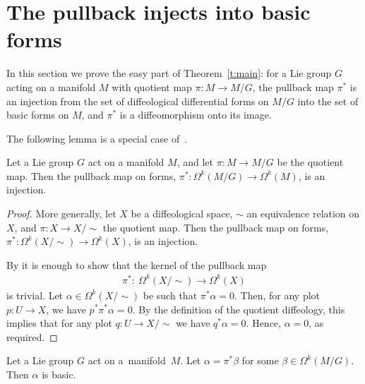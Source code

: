 \section{The pullback injects into basic forms}\label{sec:injects}

In this section we prove the easy part of Theorem~\ref{t:main}:
for a Lie group $G$ acting on a manifold $M$
with quotient map $\pi \colon M \to M/G$,
the pullback map $\pi^*$ is an injection
from the set of dif\/feological dif\/ferential forms on $M/G$
into the set of basic forms on $M$,
and $\pi^*$ is a dif\/feomorphism onto its image.

The following lemma is a special case of~\cite[Section~6.39]{iglesias}.

\begin{Lemma} \label{l:pullback is injection}
Let a Lie group $G$ act on a manifold $M$,
and let $\pi \colon M \to M/G$ be the quotient map.
Then the pullback map on forms,
$\pi^* \colon \Omega^k(M/G) \to \Omega^k(M)$, is an injection.
\end{Lemma}



\begin{proof}
More generally, let $X$ be a dif\/feological space, $\sim$ an equivalence
relation on $X$, and $\pi \colon X \to X/\!\!\sim$ the quotient map.
Then the pullback map on forms,
$\pi^* \colon \Omega^k(X/\!\!\sim) \to \Omega^k(X)$, is an injection.

By  it is enough to show that
the kernel of the pullback map
\begin{gather*}\pi^* \colon \ \Omega^k(X/\!\!\sim) \to \Omega^k(X)\end{gather*}
is trivial.
Let $\alpha \in \Omega^k(X/\!\!\sim)$
be such that $\pi^* \alpha = 0$.
Then, for any plot $p \colon U \to X$, we have $p^* \pi^* \alpha= 0$.
By the def\/inition of the quotient dif\/feology, this implies that
for any plot $q \colon U \to X/\!\!\sim$ we have $q^* \alpha = 0$.
Hence, $\alpha = 0$, as required.
\end{proof}

\begin{Proposition}
\label{p:pullbacksarebasic}
Let a Lie group $G$ act on a~mani\-fold~$M$.
Let $\alpha = \pi^*\beta$ for some $\beta \in \Omega^k(M/G)$.
Then $\alpha$ is basic.
\end{Proposition}

